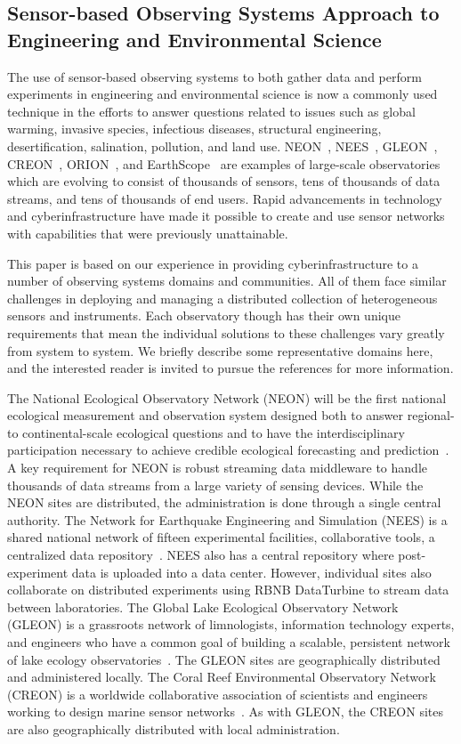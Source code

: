 \subsection{Sensor-based Observing Systems Approach to Engineering and Environmental Science}\label{sec:domains}

The use of sensor-based observing systems to both gather data and perform experiments in engineering and environmental science is now a commonly used technique in the efforts to answer questions related to issues such as global warming, invasive species, infectious diseases, structural engineering, desertification, salination, pollution, and land use.  NEON~\cite{NEON}, NEES~\cite{NEES}, GLEON~\cite{GLEON},
CREON~\cite{CREON}, ORION~\cite{ORION}, and EarthScope~\cite{earthscope} are examples of large-scale observatories which are evolving to consist of thousands of sensors, tens of thousands of data streams, and tens of thousands of end users.  Rapid advancements in technology and cyberinfrastructure have made it possible to create and use sensor networks with capabilities that were previously unattainable.  

This paper is based on our experience in providing cyberinfrastructure to a number of observing systems domains and communities.  All of them face similar challenges in deploying and managing a distributed collection of heterogeneous sensors and instruments. Each observatory though has their own unique requirements that mean the individual solutions to these challenges vary greatly from system to system.
We briefly describe some representative domains here, and the interested reader is invited to pursue the references for more information.

The National Ecological Observatory Network (NEON) will be the first national ecological measurement and observation system designed both to answer regional- to continental-scale ecological questions and to have the interdisciplinary participation necessary to achieve credible ecological forecasting and prediction~\cite{NEON}. A key requirement for NEON is robust streaming data middleware to handle thousands of data streams from a large variety of sensing devices. While the NEON sites are distributed, the administration is done through a single central authority.
The Network for Earthquake Engineering and Simulation (NEES) is a shared national network of fifteen experimental facilities, collaborative tools, a centralized data repository~\cite{NEES}. NEES also has a central repository where post-experiment data is uploaded into a data center.  However, individual sites also collaborate on distributed experiments using RBNB DataTurbine to stream data between laboratories.
The Global Lake Ecological Observatory Network (GLEON) is a grassroots network of limnologists, information technology experts, and engineers who have a common goal of building a scalable, persistent network of lake ecology observatories~\cite{GLEON}.  The GLEON sites are geographically distributed and administered locally.  
The Coral Reef Environmental Observatory Network (CREON) is a worldwide collaborative association of scientists and engineers working to design marine sensor networks~\cite{CREON}.  As with GLEON, the CREON sites are also geographically distributed with local administration.  


